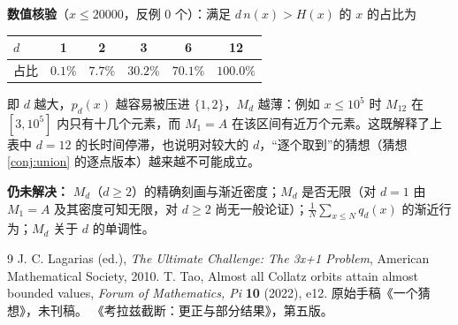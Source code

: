 \documentclass[11pt]{article}
\theoremstyle{definition}
\theoremstyle{definition}
\theoremstyle{remark}
\begin{document}
\textbf{数值核验}（\(x\le20000\)，反例 \(0\) 个）：满足 \(d\,n(x)>H(x)\) 的 \(x\) 的占比为
\begin{center}
\begin{tabular}{lccccc}
\toprule
\(d\) & 1 & 2 & 3 & 6 & 12\\
\midrule
占比 & \(0.1\%\) & \(7.7\%\) & \(30.2\%\) & \(70.1\%\) & \(100.0\%\)\\
\bottomrule
\end{tabular}
\end{center}
即 \(d\) 越大，\(p_d(x)\) 越容易被压进 \(\{1,2\}\)，\(M_d\) 越薄：例如 \(x\le10^5\) 时 \(M_{12}\) 在 \([3,10^5]\) 内只有十几个元素，而 \(M_1=A\) 在该区间有近万个元素。这既解释了上表中 \(d=12\) 的长时间停滞，也说明对较大的 \(d\)，“逐个取到”的猜想（猜想 \ref{conj:union} 的逐点版本）越来越不可能成立。

\textbf{仍未解决：} \(M_d\)（\(d\ge2\)）的精确刻画与渐近密度；\(M_d\) 是否无限（对 \(d=1\) 由 \(M_1=A\) 及其密度可知无限，对 \(d\ge2\) 尚无一般论证）；\(\frac1N\sum_{x\le N}q_d(x)\) 的渐近行为；\(M_d\) 关于 \(d\) 的单调性。

\begin{thebibliography}{9}
 J. C. Lagarias (ed.), \emph{The Ultimate Challenge: The 3x+1 Problem}, American Mathematical Society, 2010.
 T. Tao, Almost all Collatz orbits attain almost bounded values, \emph{Forum of Mathematics, Pi} \textbf{10} (2022), e12.
 原始手稿《一个猜想》，未刊稿。
 《考拉兹截断：更正与部分结果》，第五版。
\end{thebibliography}
\end{document}
